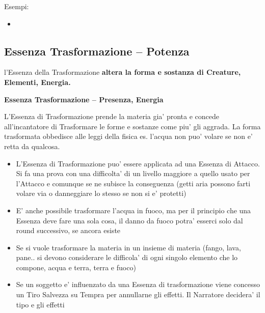 \documentclass[a4paper,11pt,twoside,openany]{book}
\begin{document}
\bigskip

Esempi:
\begin{itemize}
\item 
{}
\end{itemize}

\pagebreak


\subsection{Essenza Trasformazione -- Potenza}

\label{essenza-trasformazione---potenza}

l'Essenza della Trasformazione \textbf{altera la forma e sostanza di Creature, Elementi, Energia.}

\bigskip

\textbf{Essenza Trasformazione -- Presenza, Energia}

L'Essenza di Trasformazione prende la materia gia' pronta e concede all'incantatore di Trasformare le forme e sostanze come piu' gli aggrada. La forma trasformata obbedisce alle leggi della fisica es. l'acqua non puo' volare se non e' retta da qualcosa.

\begin{itemize}
\item 
L'Essenza di Trasformazione puo' essere applicata ad una Essenza di Attacco. Si fa una prova con una difficolta' di un livello maggiore a quello usato per l'Attacco e comunque se ne subisce la conseguenza (getti aria possono farti volare via o danneggiare lo stesso se non si e' protetti) 
\item 
E' anche possibile trasformare l'acqua in fuoco, ma per il principio che una Essenza deve fare una sola cosa, il danno da fuoco potra' esserci solo dal round successivo, se ancora esiste 
\item 
Se si vuole trasformare la materia in un insieme di materia (fango, lava, pane.. si devono considerare le difficola' di ogni singolo elemento che lo compone, acqua e terra, terra e fuoco) 
\item 
Se un soggetto e' influenzato da una Essenza di trasformazione viene concesso un Tiro Salvezza su Tempra per annullarne gli effetti. Il Narratore decidera' il tipo e gli effetti 
\end{itemize}
\end{document}

